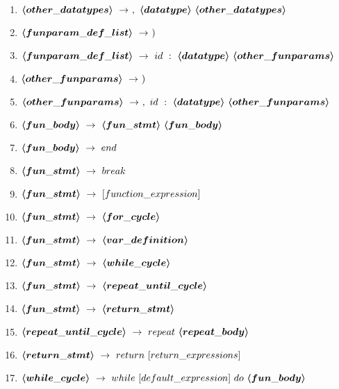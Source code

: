 \begin{enumerate}
	\item $\mbox{\boldmath$\langle{}other\_datatypes\rangle{}$}\ \rightarrow\ ,\ \mbox{\boldmath$\langle{}datatype\rangle{}$}\ \mbox{\boldmath$\langle{}other\_datatypes\rangle{}$}$
	\item $\mbox{\boldmath$\langle{}funparam\_def\_list\rangle{}$}\ \rightarrow\ )$
	\item $\mbox{\boldmath$\langle{}funparam\_def\_list\rangle{}$}\ \rightarrow\ id\ :\ \mbox{\boldmath$\langle{}datatype\rangle{}$}\ \mbox{\boldmath$\langle{}other\_funparams\rangle{}$}$
	\item $\mbox{\boldmath$\langle{}other\_funparams\rangle{}$}\ \rightarrow\ )$
	\item $\mbox{\boldmath$\langle{}other\_funparams\rangle{}$}\ \rightarrow\ ,\ id\ :\ \mbox{\boldmath$\langle{}datatype\rangle{}$}\ \mbox{\boldmath$\langle{}other\_funparams\rangle{}$}$
	\item $\mbox{\boldmath$\langle{}fun\_body\rangle{}$}\ \rightarrow\ \mbox{\boldmath$\langle{}fun\_stmt\rangle{}$}\ \mbox{\boldmath$\langle{}fun\_body\rangle{}$}$
	\item $\mbox{\boldmath$\langle{}fun\_body\rangle{}$}\ \rightarrow\ end$
	\item $\mbox{\boldmath$\langle{}fun\_stmt\rangle{}$}\ \rightarrow\ break$
	\item $\mbox{\boldmath$\langle{}fun\_stmt\rangle{}$}\ \rightarrow\ [function\_expression]$
	\item $\mbox{\boldmath$\langle{}fun\_stmt\rangle{}$}\ \rightarrow\ \mbox{\boldmath$\langle{}for\_cycle\rangle{}$}$
	\item $\mbox{\boldmath$\langle{}fun\_stmt\rangle{}$}\ \rightarrow\ \mbox{\boldmath$\langle{}var\_definition\rangle{}$}$
	\item $\mbox{\boldmath$\langle{}fun\_stmt\rangle{}$}\ \rightarrow\ \mbox{\boldmath$\langle{}while\_cycle\rangle{}$}$
	\item $\mbox{\boldmath$\langle{}fun\_stmt\rangle{}$}\ \rightarrow\ \mbox{\boldmath$\langle{}repeat\_until\_cycle\rangle{}$}$
	\item $\mbox{\boldmath$\langle{}fun\_stmt\rangle{}$}\ \rightarrow\ \mbox{\boldmath$\langle{}return\_stmt\rangle{}$}$
	\item $\mbox{\boldmath$\langle{}repeat\_until\_cycle\rangle{}$}\ \rightarrow\ repeat\ \mbox{\boldmath$\langle{}repeat\_body\rangle{}$}$
	\item $\mbox{\boldmath$\langle{}return\_stmt\rangle{}$}\ \rightarrow\ return\ [return\_expressions]$
	\item $\mbox{\boldmath$\langle{}while\_cycle\rangle{}$}\ \rightarrow\ while\ [default\_expression]\ do\ \mbox{\boldmath$\langle{}fun\_body\rangle{}$}$

\end{enumerate}
